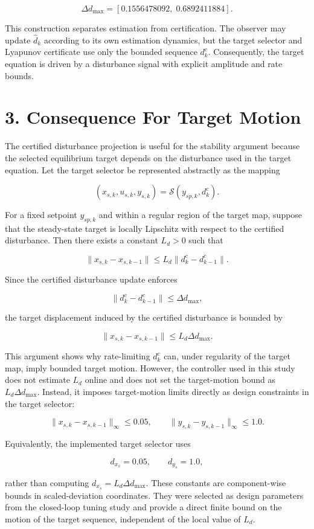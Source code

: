 \documentclass[11pt]{article}
\begin{document}
\[
\Delta d_{\max}=[0.1556478092,\;0.6892411884].
\]

This construction separates estimation from certification. The observer may update $\hat d_k$ according to its own estimation dynamics, but the target selector and Lyapunov certificate use only the bounded sequence $d^c_k$. Consequently, the target equation is driven by a disturbance signal with explicit amplitude and rate bounds.


\section*{3. Consequence For Target Motion}

The certified disturbance projection is useful for the stability argument because the selected equilibrium target depends on the disturbance used in the target equation. Let the target selector be represented abstractly as the mapping


\[
(x_{s,k},u_{s,k},y_{s,k})
=
\mathcal S(y_{sp,k},d^c_k).
\]

For a fixed setpoint $y_{sp,k}$ and within a regular region of the target map, suppose that the steady-state target is locally Lipschitz with respect to the certified disturbance. Then there exists a constant $L_d>0$ such that


\[
\|x_{s,k}-x_{s,k-1}\|
\le
L_d\|d^c_k-d^c_{k-1}\|.
\]

Since the certified disturbance update enforces


\[
\|d^c_k-d^c_{k-1}\|
\le
\Delta d_{\max},
\]

the target displacement induced by the certified disturbance is bounded by


\[
\|x_{s,k}-x_{s,k-1}\|
\le
L_d\Delta d_{\max}.
\]

This argument shows why rate-limiting $d^c_k$ can, under regularity of the target map, imply bounded target motion. However, the controller used in this study does not estimate $L_d$ online and does not set the target-motion bound as $L_d\Delta d_{\max}$. Instead, it imposes target-motion limits directly as design constraints in the target selector:


\[
\|x_{s,k}-x_{s,k-1}\|_\infty \le 0.05,
\qquad
\|y_{s,k}-y_{s,k-1}\|_\infty \le 1.0.
\]

Equivalently, the implemented target selector uses


\[
d_{x_s}=0.05,
\qquad
d_{y_s}=1.0,
\]

rather than computing $d_{x_s}=L_d\Delta d_{\max}$. These constants are component-wise bounds in scaled-deviation coordinates. They were selected as design parameters from the closed-loop tuning study and provide a direct finite bound on the motion of the target sequence, independent of the local value of $L_d$.
\end{document}

